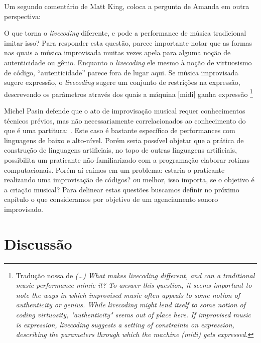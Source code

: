 Um segundo comentário de Matt King, coloca a pergunta de Amanda em outra perspectiva:

\begin{citacao}
O que torna o \emph{livecoding} diferente, e pode a performance de música tradicional imitar isso? Para responder esta questão, parece importante notar que as formas nas quais a música improvisada muitas vezes apela para alguma noção de autenticidade ou gênio. Enquanto o \emph{livecoding} ele mesmo à noção de virtuosismo de código, ``autenticidade'' parece fora de lugar aqui. Se música improvisada sugere expressão, o \emph{livecoding} sugere um conjunto de restrições na expressão, descrevendo os parâmetros através dos quais a máquina $[$midi$]$ ganha expressão \footnote{Tradução nossa de \emph{(\ldots) What makes livecoding different, and can a traditional music performance mimic it? To answer this question, it seems important to note the ways in which improvised music often appeals to some notion of authenticity or genius. While livecoding might lend itself to some notion of coding virtuosity, "authenticity" seems out of place here. If improvised music is expression, livecoding suggests a setting of constraints on expression, describing the parameters through which the machine (midi) gets expressed.}}
\end{citacao}

Michel Pasin defende que o ato de improvisação musical requer conhecimentos técnicos prévios, mas não necessariamente correlacionados ao conhecimento do que é uma partitura: . Este caso é bastante específico de performances com linguagens de baixo e alto-nível. Porém seria possível objetar que a prática de construção de linguagens artificiais, no topo de outras linguagens artificiais, possibilita um praticante não-familiarizado com a programação elaborar rotinas computacionais.  Porém aí caímos em um problema: estaria o praticante realizando uma improvisação de códigos? ou melhor, isso importa, se o objetivo é a criação musical? Para delinear estas questões buscamos definir no próximo capítulo o que consideramos por objetivo de um agenciamento sonoro improvisado.

\section{Discussão}

